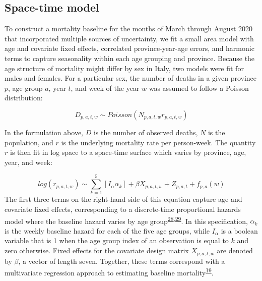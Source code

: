 \documentclass[
]{article}
\begin{document}
\hypertarget{space-time-model}{%
\subsection{Space-time model}\label{space-time-model}}

To construct a mortality baseline for the months of March through August 2020 that incorporated multiple sources of uncertainty, we fit a small area model with age and covariate fixed effects, correlated province-year-age errors, and harmonic terms to capture seasonality within each age grouping and province. Because the age structure of mortality might differ by sex in Italy, two models were fit for males and females. For a particular sex, the number of deaths in a given province \(p\), age group \(a\), year \(t\), and week of the year \(w\) was assumed to follow a Poisson distribution:

\[D_{p,a,t,w} \sim Poisson(N_{p,a,t,w}r_{p,a,t,w})\]

In the formulation above, \(D\) is the number of observed deaths, \(N\) is the population, and \(r\) is the underlying mortality rate per person-week. The quantity \(r\) is then fit in log space to a space-time surface which varies by province, age, year, and week:

\[log(r_{p,a,t,w}) \sim \sum_{k=1}^{5}[I_{\alpha}\alpha_{k}] + \beta X_{p,a,t,w} + Z_{p,a,t} + f_{p,a}(w)\]
The first three terms on the right-hand side of this equation capture age and covariate fixed effects, corresponding to a discrete-time proportional hazards model where the baseline hazard varies by age group\textsuperscript{\protect\hyperlink{ref-Cox1972}{28},\protect\hyperlink{ref-Burstein2019}{29}}⁠. In this specification, \(\alpha_k\) is the weekly baseline hazard for each of the five age groups, while \(I_\alpha\) is a boolean variable that is 1 when the age group index of an observation is equal to \(k\) and zero otherwise. Fixed effects for the covariate design matrix \(X_{p,a,t,w}\) are denoted by \(\beta\), a vector of length seven. Together, these terms correspond with a multivariate regression approach to estimating baseline mortality\textsuperscript{\protect\hyperlink{ref-Ederer1961}{19}}⁠.
\end{document}
